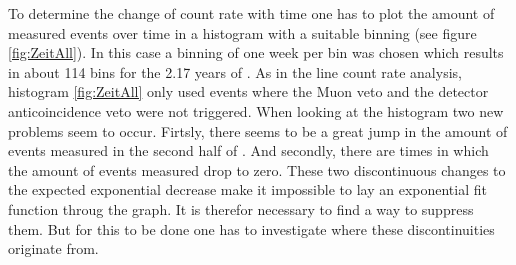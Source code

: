 \documentclass[encoding=utf8,british]{tumphthesis}
\begin{document}
To determine the change of count rate with time one has to plot the amount of measured events over time in a histogram with a suitable binning (see figure \ref{fig:ZeitAll}).
In this case a binning of one week per bin was chosen which results in about 114 bins for the 2.17 years of \PII.
As in the line count rate analysis, histogram \ref{fig:ZeitAll} only used events where the Muon veto and the detector anticoincidence veto were not triggered.
When looking at the histogram two new problems seem to occur.
Firtsly, there seems to be a great jump in the amount of events measured in the second half of \PII.
And secondly, there are times in which the amount of events measured drop to zero.
These two discontinuous changes to the expected exponential decrease make it impossible to lay an exponential fit function throug the graph.
It is therefor necessary to find a way to suppress them.
But for this to be done one has to investigate where these discontinuities originate from.
\\
\end{document}
